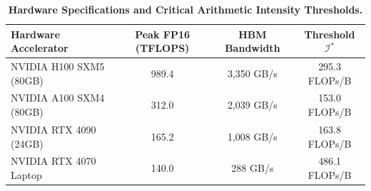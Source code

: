 \begin{table}[h]
\centering
\small
\caption{\textbf{Hardware Specifications and Critical Arithmetic Intensity Thresholds.}}
\label{tab:hardware_specs}
\begin{tabularx}{\columnwidth}{lccc}
\toprule
\textbf{Hardware Accelerator} & \textbf{Peak FP16 (TFLOPS)} & \textbf{HBM Bandwidth} & \textbf{Threshold $\mathcal{I}^*$} \\
\midrule
NVIDIA H100 SXM5 (80GB) & 989.4 & 3,350 GB/s & 295.3 FLOPs/B \\
NVIDIA A100 SXM4 (80GB) & 312.0 & 2,039 GB/s & 153.0 FLOPs/B \\
NVIDIA RTX 4090 (24GB) & 165.2 & 1,008 GB/s & 163.8 FLOPs/B \\
NVIDIA RTX 4070 Laptop & 140.0 & 288 GB/s & 486.1 FLOPs/B \\
\bottomrule
\end{tabularx}
\end{table}

